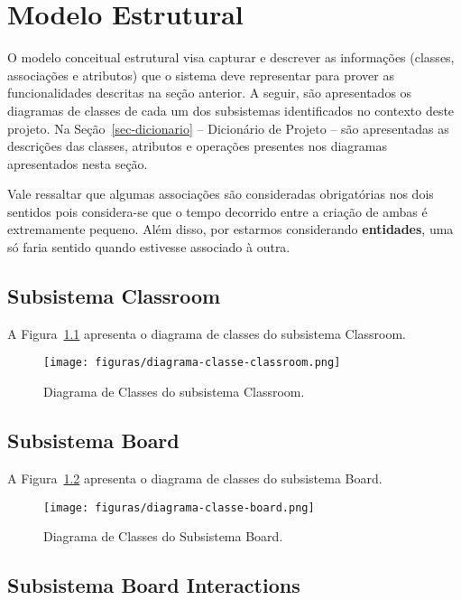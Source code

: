 \chapter{Modelo Estrutural}
\label{sec-modelo-estrutural}

O modelo conceitual estrutural visa capturar e descrever as informações (classes, associações e atributos) que o sistema deve representar para prover as funcionalidades descritas na seção anterior. A seguir, são apresentados os diagramas de classes de cada um dos subsistemas identificados no contexto deste projeto. Na Seção~\ref{sec-dicionario} – Dicionário de Projeto – são apresentadas as descrições das classes, atributos e operações presentes nos diagramas apresentados nesta seção.

 Vale ressaltar que algumas associações são consideradas obrigatórias nos dois sentidos pois considera-se que o tempo decorrido entre a criação de ambas é extremamente pequeno. Além disso, por estarmos considerando \textbf{entidades}, uma só faria sentido quando estivesse associado à outra.

\section{Subsistema Classroom}


A Figura~\ref{figura-classroom-classe} apresenta o diagrama de classes do subsistema Classroom.

\begin{figure}[h]
	\centering
	\texttt{[image: figuras/diagrama-classe-classroom.png]}
	\caption{Diagrama de Classes do subsistema Classroom.}
	\label{figura-classroom-classe}
\end{figure} 

\newpage

\section{Subsistema Board}


A Figura~\ref{figura-board-classe} apresenta o diagrama de classes do subsistema Board.

\begin{figure}[h]
	\centering
	\texttt{[image: figuras/diagrama-classe-board.png]}
	\caption{Diagrama de Classes do Subsistema Board.}
	\label{figura-board-classe}
\end{figure} 
\newpage

\section{Subsistema Board Interactions}


